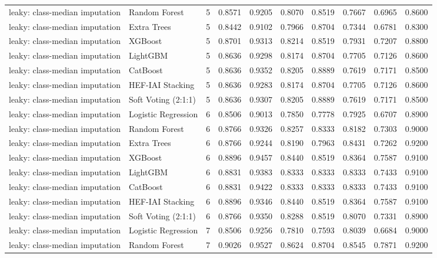 \begin{tabular}{llrrrrrrrr}
leaky: class-median imputation & Random Forest & 5 & 0.8571 & 0.9205 & 0.8070 & 0.8519 & 0.7667 & 0.6965 & 0.8600 \\
leaky: class-median imputation & Extra Trees & 5 & 0.8442 & 0.9102 & 0.7966 & 0.8704 & 0.7344 & 0.6781 & 0.8300 \\
leaky: class-median imputation & XGBoost & 5 & 0.8701 & 0.9313 & 0.8214 & 0.8519 & 0.7931 & 0.7207 & 0.8800 \\
leaky: class-median imputation & LightGBM & 5 & 0.8636 & 0.9298 & 0.8174 & 0.8704 & 0.7705 & 0.7126 & 0.8600 \\
leaky: class-median imputation & CatBoost & 5 & 0.8636 & 0.9352 & 0.8205 & 0.8889 & 0.7619 & 0.7171 & 0.8500 \\
leaky: class-median imputation & HEF-IAI Stacking & 5 & 0.8636 & 0.9283 & 0.8174 & 0.8704 & 0.7705 & 0.7126 & 0.8600 \\
leaky: class-median imputation & Soft Voting (2:1:1) & 5 & 0.8636 & 0.9307 & 0.8205 & 0.8889 & 0.7619 & 0.7171 & 0.8500 \\
leaky: class-median imputation & Logistic Regression & 6 & 0.8506 & 0.9013 & 0.7850 & 0.7778 & 0.7925 & 0.6707 & 0.8900 \\
leaky: class-median imputation & Random Forest & 6 & 0.8766 & 0.9326 & 0.8257 & 0.8333 & 0.8182 & 0.7303 & 0.9000 \\
leaky: class-median imputation & Extra Trees & 6 & 0.8766 & 0.9244 & 0.8190 & 0.7963 & 0.8431 & 0.7262 & 0.9200 \\
leaky: class-median imputation & XGBoost & 6 & 0.8896 & 0.9457 & 0.8440 & 0.8519 & 0.8364 & 0.7587 & 0.9100 \\
leaky: class-median imputation & LightGBM & 6 & 0.8831 & 0.9383 & 0.8333 & 0.8333 & 0.8333 & 0.7433 & 0.9100 \\
leaky: class-median imputation & CatBoost & 6 & 0.8831 & 0.9422 & 0.8333 & 0.8333 & 0.8333 & 0.7433 & 0.9100 \\
leaky: class-median imputation & HEF-IAI Stacking & 6 & 0.8896 & 0.9346 & 0.8440 & 0.8519 & 0.8364 & 0.7587 & 0.9100 \\
leaky: class-median imputation & Soft Voting (2:1:1) & 6 & 0.8766 & 0.9350 & 0.8288 & 0.8519 & 0.8070 & 0.7331 & 0.8900 \\
leaky: class-median imputation & Logistic Regression & 7 & 0.8506 & 0.9256 & 0.7810 & 0.7593 & 0.8039 & 0.6684 & 0.9000 \\
leaky: class-median imputation & Random Forest & 7 & 0.9026 & 0.9527 & 0.8624 & 0.8704 & 0.8545 & 0.7871 & 0.9200 \\

\end{tabular}
